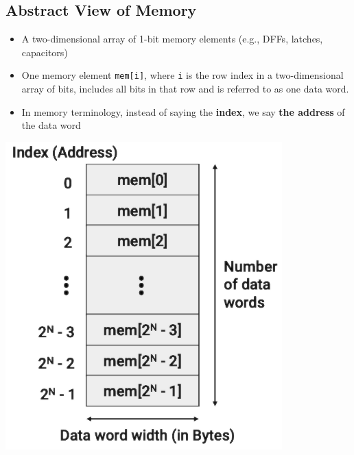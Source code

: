 \documentclass[12pt,openany]{book}
\begin{document}
\subsection{Abstract View of Memory}
\begin{minipage}{0.45\textwidth}
    \begin{itemize}
        \item[] A two-dimensional array of 1-bit memory elements (e.g., DFFs, latches, capacitors)
		\item[] One memory element \texttt{mem[i]}, where \texttt{i} is the row index in a two-dimensional array of bits, includes all bits in that row and is referred to as one data word.

        \item[] In memory terminology, instead of saying the \textbf{index}, we say \textbf{the address} of the data word
    \end{itemize}
\end{minipage} \hfill
\begin{minipage}{0.5\textwidth}
    \centering
    \includegraphics[width=0.8\textwidth]{circuits/16.2.1.png}
\end{minipage}
\end{document}
